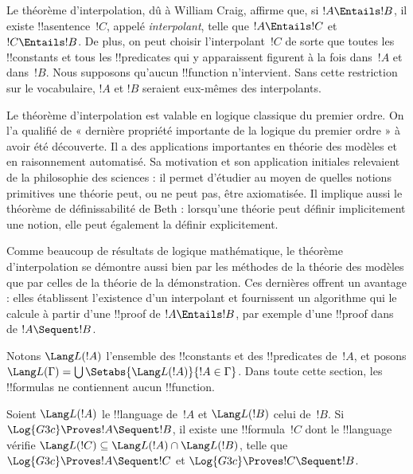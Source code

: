 \documentclass[../../../include/open-logic-section]{subfiles}
\begin{document}


Le théorème d'interpolation, dû à William Craig, affirme que, si
$!A \Entails !B$, il existe !!a{sentence}~$!C$, appelé
\emph{interpolant}, telle que $!A \Entails !C$ et $!C \Entails !B$.
De plus, on peut choisir l'interpolant~$!C$ de sorte que toutes les
!!{constant}s et tous les !!{predicate}s qui y apparaissent figurent à la fois
dans~$!A$ et dans~$!B$. Nous supposons qu'aucun !!{function} n'intervient.
Sans cette restriction sur le vocabulaire, $!A$ et $!B$ seraient
eux-mêmes des interpolants.

Le théorème d'interpolation est valable en logique classique du premier
ordre. On l'a qualifié de « dernière propriété importante de la logique
du premier ordre » à avoir été découverte. Il a des applications
importantes en théorie des modèles et en raisonnement automatisé.
Sa motivation et son application initiales relevaient de la philosophie
des sciences : il permet d'étudier au moyen de quelles notions primitives
une théorie peut, ou ne peut pas, être axiomatisée. Il implique aussi
le théorème de définissabilité de Beth : lorsqu'une théorie peut définir
implicitement une notion, elle peut également la définir explicitement.

Comme beaucoup de résultats de logique mathématique, le théorème
d'interpolation se démontre aussi bien par les méthodes de la théorie
des modèles que par celles de la théorie de la démonstration. Ces
dernières offrent un avantage : elles établissent l'existence d'un
interpolant et fournissent un algorithme qui le calcule à partir d'une
!!{proof} de $!A \Entails !B$, par exemple d'une !!{proof} dans
 de $!A \Sequent !B$.

Notons $\Lang L(!A)$ l'ensemble des !!{constant}s et des !!{predicate}s
de~$!A$, et posons $\Lang L(\Gamma) = \bigcup \Setabs{\Lang L(!A)}{!A \in
\Gamma}$. Dans toute cette section, les !!{formula}s ne contiennent
aucun !!{function}.

\begin{thm}
Soient $\Lang L(!A)$ le !!{language} de~$!A$ et $\Lang L(!B)$ celui
de~$!B$. Si $\Log{G3c} \Proves !A \Sequent !B$, il existe une
!!{formula}~$!C$ dont le !!{language} vérifie
$\Lang L(!C) \subseteq \Lang L(!A) \cap \Lang L(!B)$, telle que
$\Log{G3c} \Proves !A \Sequent !C$ et
$\Log{G3c} \Proves !C \Sequent !B$.
\end{thm}
\end{document}
